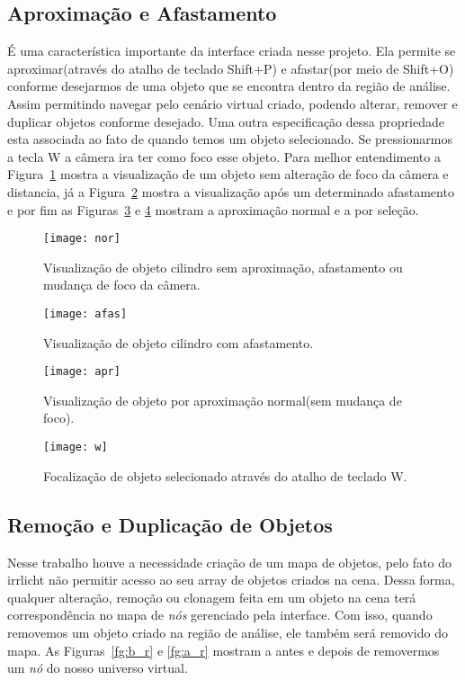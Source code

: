 	\subsection{Aproximação e Afastamento}
	É uma característica importante da interface criada nesse projeto. Ela permite se aproximar(através do atalho de teclado Shift+P) e afastar(por meio de Shift+O) conforme desejarmos de uma objeto que se encontra dentro da região de análise. Assim permitindo navegar pelo cenário virtual criado, podendo alterar, remover e duplicar objetos conforme desejado. Uma outra especificação dessa propriedade esta associada ao fato de quando temos um objeto selecionado. Se pressionarmos a tecla W a câmera ira ter como foco esse objeto. Para melhor entendimento a Figura~\ref{fg:nor} mostra a visualização de um objeto sem alteração de foco da câmera e distancia, já a Figura~\ref{fg:afas} mostra a visualização após um determinado afastamento e por fim as Figuras~\ref{fg:apr} e \ref{fg:w} mostram a aproximação normal e a por seleção.
	
\begin{figure}[ht!]
	\centering
	\texttt{[image: nor]}
	\caption{Visualização de objeto cilindro sem aproximação, afastamento ou mudança de foco da câmera.}
	\label{fg:nor}
\end{figure}
\begin{figure}[ht!]
	\centering
	\texttt{[image: afas]}
	\caption{Visualização de objeto cilindro com afastamento.}
	\label{fg:afas}
\end{figure}
\begin{figure}[ht!]
	\centering
	\texttt{[image: apr]}
	\caption{Visualização de objeto por aproximação normal(sem mudança de foco).}
	\label{fg:apr}
\end{figure}
\begin{figure}[ht!]
	\centering
	\texttt{[image: w]}
	\caption{Focalização de objeto selecionado através do atalho de teclado W.}
	\label{fg:w}
\end{figure}

	\subsection{Remoção e Duplicação de Objetos}
	Nesse trabalho houve a necessidade criação de um mapa de objetos, pelo fato do irrlicht não permitir acesso ao seu array de objetos criados na cena. Dessa forma, qualquer alteração, remoção ou clonagem feita em um objeto na cena terá correspondência no mapa de \textit{nós} gerenciado pela interface. Com isso, quando removemos um objeto criado na região de análise, ele também será removido do mapa. As Figuras~\ref{fg:b_r} e \ref{fg:a_r} mostram a antes e depois de removermos um \textit{nó} do nosso universo virtual. \\
	
